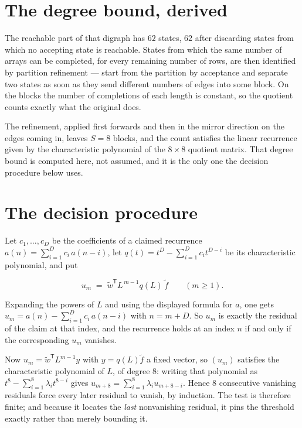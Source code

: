\documentclass[11pt]{article}
\theoremstyle{definition}
\begin{document}
\section{The degree bound, derived}

The reachable part of that digraph has $62$ states, $62$ after discarding states from which no accepting state is reachable. States from which the same number of arrays can be completed, for every remaining number of rows, are then identified by partition refinement --- start from the partition by acceptance and separate two states as soon as they send different numbers of edges into some block. On the blocks the number of completions of each length is constant, so the quotient counts exactly what the original does.

The refinement, applied first forwards and then in the mirror direction on the edges coming in, leaves $S = 8$ blocks, and the count satisfies the linear recurrence given by the characteristic polynomial of the $8 \times 8$ quotient matrix. That degree bound is computed here, not assumed, and it is the only one the decision procedure below uses.

\section{The decision procedure}

Let $c_1,\dots,c_D$ be the coefficients of a claimed recurrence $a(n) = \sum_{i=1}^{D} c_i\,a(n-i)$, let $q(t) = t^{D} - \sum_{i=1}^{D} c_i t^{D-i}$ be its characteristic polynomial, and put

\[u_m \;=\; \tilde w^{\mathsf T} L^{\,m-1} q(L)\,\tilde f \qquad (m \ge 1).\]

Expanding the powers of $L$ and using the displayed formula for $a$, one gets $u_m = a(n) - \sum_{i=1}^{D} c_i\,a(n-i)$ with $n = m + D$. So $u_m$ is exactly the residual of the claim at that index, and the recurrence holds at an index $n$ if and only if the corresponding $u_m$ vanishes.

Now $u_m = \tilde w^{\mathsf T} L^{m-1} y$ with $y = q(L)\tilde f$ a fixed vector, so $(u_m)$ satisfies the characteristic polynomial of $L$, of degree $8$: writing that polynomial as $t^{8} - \sum_{i=1}^{8} \lambda_i t^{8-i}$ gives $u_{m+8} = \sum_{i=1}^{8} \lambda_i u_{m+8-i}$. Hence $8$ consecutive vanishing residuals force every later residual to vanish, by induction. The test is therefore finite; and because it locates the {\itshape last} nonvanishing residual, it pins the threshold exactly rather than merely bounding it.
\end{document}

